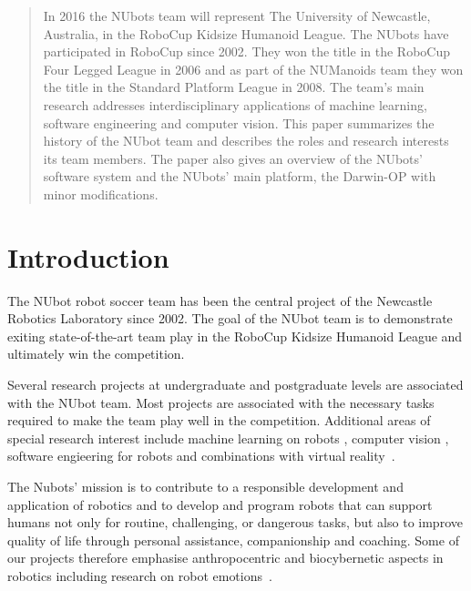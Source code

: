 \documentclass{llncs}
\begin{document}
\begin{abstract}
In 2016 the NUbots team will represent The University of Newcastle, Australia, in the RoboCup Kidsize Humanoid League. The NUbots have participated in RoboCup since 2002. They won the title in the RoboCup Four Legged League in 2006 and as part of the NUManoids team they won the title in the Standard Platform League in 2008. The team's main research addresses interdisciplinary applications of machine learning, software engineering and computer vision. This paper summarizes the history of the NUbot team and describes the roles and research interests its team members. The paper also gives an overview of the NUbots'  software system and the NUbots' main platform, the Darwin-OP with minor modifications.

\end{abstract}

%
\section{Introduction}
The NUbot robot soccer team has been the central project of the Newcastle Robotics Laboratory since 2002. The goal of the NUbot team is to demonstrate exiting state-of-the-art team play in the RoboCup Kidsize Humanoid League and ultimately win the competition.

Several research projects at undergraduate and postgraduate levels are associated with the NUbot team. Most projects are associated with the necessary tasks required to make the team play well in the competition. Additional areas of special research interest include machine learning on robots \cite{ChalupEtAlSMC2007,FountainEtAl2014}, computer vision \cite{MetcalfeEtAl2016}, software engieering for robots \cite{HoulistonEtAlNUClear2016} and combinations with virtual reality~\cite{FountainChalup2015}.

The Nubots' mission is to contribute to a responsible development and application of robotics and to develop and program robots that can support humans not only for routine, challenging, or dangerous tasks, but also to improve quality of life through personal assistance, companionship and coaching. Some of our projects therefore emphasise anthropocentric and biocybernetic aspects in robotics including research on robot emotions~\cite{ChalupOstwald2009,WalkerChalup2015,HongEtAl2014,WongEtAl2012,WongEtAl2013}.
\end{document}
